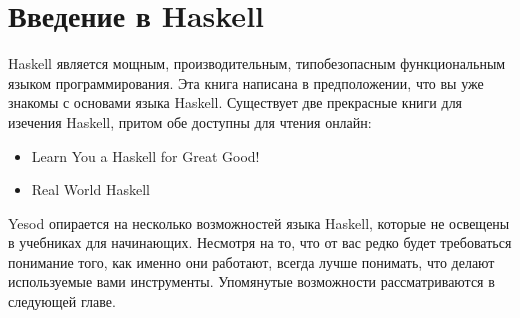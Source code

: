 \section{Введение в Haskell}

Haskell является мощным, производительным, типобезопасным функциональным языком программирования. Эта книга написана в предположении, что вы уже знакомы с основами языка Haskell. Существует две прекрасные книги для изечения Haskell, притом обе доступны для чтения онлайн:

\begin{itemize}
  \item Learn You a Haskell for Great Good!
  \item Real World Haskell
\end{itemize}

Yesod опирается на несколько возможностей языка Haskell, которые не освещены в учебниках для начинающих. Несмотря на то, что от вас редко будет требоваться понимание того, как именно они работают, всегда лучше понимать, что делают используемые вами инструменты. Упомянутые возможности рассматриваются в следующей главе.

